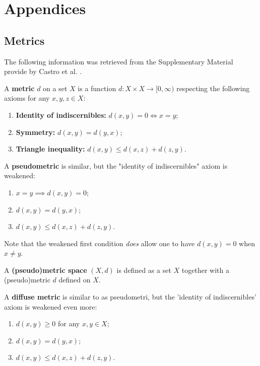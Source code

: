 \appendix
\chapter{Appendices}

\section{Metrics}
\label{append:metrics}

The following information was retrieved from the Supplementary Material provide by Castro et al. \cite{castro2021mico}. 

A \textbf{metric} \(d\) on a set \(X\) is a function \(d : X \times X \to [0, \infty)\) respecting the following axioms for any \(x, y, z \in X\):

\begin{enumerate}
    \item \textbf{Identity of indiscernibles:} \(d(x, y) = 0 \iff x = y\);
    \item \textbf{Symmetry:} \(d(x, y) = d(y, x)\);
    \item \textbf{Triangle inequality:} \(d(x, y) \leq d(x, z) + d(z, y)\).
\end{enumerate}

A \textbf{pseudometric} is similar, but the "identity of indiscernibles" axiom is weakened:

\begin{enumerate}
    \item \(x = y \implies d(x, y) = 0\);
    \item \(d(x, y) = d(y, x)\);
    \item \(d(x, y) \leq d(x, z) + d(z, y)\).
\end{enumerate}

Note that the weakened first condition \emph{does} allow one to have \(d(x, y) = 0\) when \(x \neq y\).

A \textbf{(pseudo)metric space} \((X, d)\) is defined as a set \(X\) together with a (pseudo)metric \(d\) defined on \(X\).

A \textbf{diffuse metric} is similar to as pseudometri, but the 'identity of indiscernibles' axiom is weakened even more:

\begin{enumerate}
    \item \(d(x, y) \geq 0\) for any $x, y \in X$;
    \item \(d(x, y) = d(y, x)\);
    \item \(d(x, y) \leq d(x, z) + d(z, y)\).
\end{enumerate}

